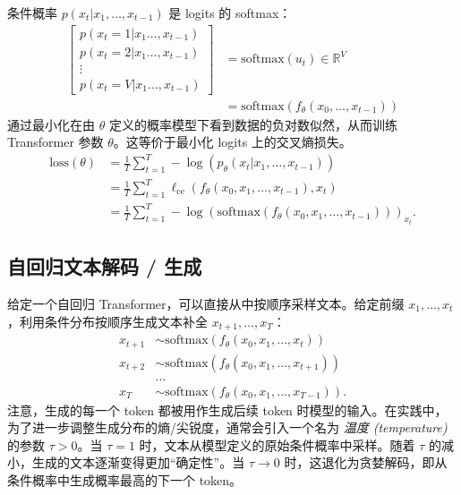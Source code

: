 条件概率 $p(x_t|x_1, \dots, x_{t-1})$ 是 logits 的 softmax：
\begin{align}
    \begin{bmatrix}
        p(x_t = 1|x_1 \dots, x_{t-1})\\
        p(x_t = 2|x_1 \dots, x_{t-1})\\
        \vdots\\
        p(x_t = V|x_1 \dots, x_{t-1})
    \end{bmatrix} 
    &= \text{softmax}(u_t) \in \mathbb{R}^V \label{eq:14.6} \\
    &= \text{softmax}(f_\theta(x_0, \dots, x_{t-1})) \label{eq:14.7}
\end{align}
通过最小化在由 $\theta$ 定义的概率模型下看到数据的负对数似然，从而训练 Transformer 参数 $\theta$。这等价于最小化 logits 上的交叉熵损失。
\begin{align}
    \text{loss}(\theta) &= \frac{1}{T} \sum_{t=1}^T -\log(p_\theta(x_t|x_1, \dots, x_{t-1})) \label{eq:14.8} \\
    &= \frac{1}{T} \sum_{t=1}^T \ell_{\text{ce}}(f_\theta(x_0, x_1, \dots, x_{t-1}), x_t) \nonumber\\
    &= \frac{1}{T} \sum_{t=1}^T -\log(\text{softmax}(f_\theta(x_0, x_1, \dots, x_{t-1})))_{x_t}.\nonumber
\end{align}

\subsection*{自回归文本解码 / 生成}

给定一个自回归 Transformer，可以直接从中按顺序采样文本。给定前缀 $x_1, \dots, x_t$，利用条件分布按顺序生成文本补全 $x_{t+1}, \dots, x_T$：
\begin{align}
    x_{t+1} &\sim \text{softmax}(f_\theta(x_0, x_1, \dots, x_t)) \label{eq:14.9} \\
    x_{t+2} &\sim \text{softmax}(f_\theta(x_0, x_1, \dots, x_{t+1})) \label{eq:14.10} \\
    &\dots \label{eq:14.11} \\
    x_T &\sim \text{softmax}(f_\theta(x_0, x_1, \dots, x_{T-1})). \label{eq:14.12}
\end{align}
注意，生成的每一个 token 都被用作生成后续 token 时模型的输入。在实践中，为了进一步调整生成分布的熵/尖锐度，通常会引入一个名为 \textit{温度 (temperature)} 的参数 $\tau > 0$。当 $\tau = 1$ 时，文本从模型定义的原始条件概率中采样。随着 $\tau$ 的减小，生成的文本逐渐变得更加“确定性”。当 $\tau \to 0$ 时，这退化为贪婪解码，即从条件概率中生成概率最高的下一个 token。

